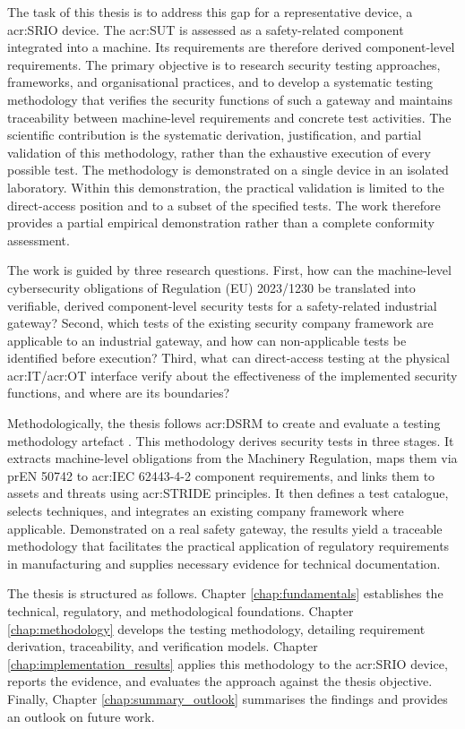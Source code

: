 The task of this thesis is to address this gap for a representative device, a \acrfull{acr:SRIO} device. The \gls{acr:SUT} is assessed as a safety-related component integrated into a machine. Its requirements are therefore derived component-level requirements. The primary objective is to research security testing approaches, frameworks, and organisational practices, and to develop a systematic testing methodology that verifies the security functions of such a gateway and maintains traceability between machine-level requirements and concrete test activities. The scientific contribution is the systematic derivation, justification, and partial validation of this methodology, rather than the exhaustive execution of every possible test. The methodology is demonstrated on a single device in an isolated laboratory. Within this demonstration, the practical validation is limited to the direct-access position and to a subset of the specified tests. The work therefore provides a partial empirical demonstration rather than a complete conformity assessment.

The work is guided by three research questions. First, how can the machine-level cybersecurity obligations of Regulation (EU) 2023/1230 be translated into verifiable, derived component-level security tests for a safety-related industrial gateway? Second, which tests of the existing security company framework are applicable to an industrial gateway, and how can non-applicable tests be identified before execution? Third, what can direct-access testing at the physical \gls{acr:IT}/\gls{acr:OT} interface verify about the effectiveness of the implemented security functions, and where are its boundaries?

Methodologically, the thesis follows \acrfull{acr:DSRM} to create and evaluate a testing methodology artefact \autocite[54]{Peffers}. This methodology derives security tests in three stages. It extracts machine-level obligations from the Machinery Regulation, maps them via prEN 50742 to \gls{acr:IEC} 62443-4-2 component requirements, and links them to assets and threats using \gls{acr:STRIDE} principles. It then defines a test catalogue, selects techniques, and integrates an existing company framework where applicable. Demonstrated on a real safety gateway, the results yield a traceable methodology that facilitates the practical application of regulatory requirements in manufacturing and supplies necessary evidence for technical documentation.

The thesis is structured as follows. Chapter \ref{chap:fundamentals} establishes the technical, regulatory, and methodological foundations. Chapter \ref{chap:methodology} develops the testing methodology, detailing requirement derivation, traceability, and verification models. Chapter \ref{chap:implementation_results} applies this methodology to the \gls{acr:SRIO} device, reports the evidence, and evaluates the approach against the thesis objective. Finally, Chapter \ref{chap:summary_outlook} summarises the findings and provides an outlook on future work.